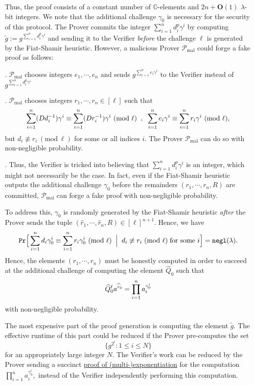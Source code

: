 \documentclass[11pt, lettersize, notitlepage, leqno, footskip=0.6cm]{article}
\newcommand{\pl}{\prod\limits}
\newcommand{\slim}{\sum\limits}
\newcommand{\ttt}{\texttt}
\newcommand{\negl}{\ttt{{negl}}}
\newcommand{\wti}{\widetilde}
\newcommand{\mc}{\mathcal}
\newcommand{\mb}{\mathbb}
\newcommand{\mbf}{\mathbf}
\newcommand{\mr}{\mathrm}
\newcommand{\lam}{\lambda}
\newcommand{\what}{\widehat}
\newcommand{\Prob}{\ttt{Pr}}
\newcommand{\bO}{\mbf{O}}
\newcommand{\mP}{\mc{P}}
\newcommand{\vs}{\vspace{-0.15cm}}
\newcommand{\noin}{\noindent}
\newcommand{\Mod}[1]{\ (\mathrm{mod}\ #1)}
\numberwithin{equation}{section}
\begin{document}
\vspace{0.2cm}

Thus, the proof consists of a constant number of $\mb{G}$-elements and $2n+\bO(1)$ $\lam$-bit integers. We note that the additional challenge $\gamma_{0}$ is necessary for the security of this protocol. The Prover commits the integer $\slim_{i=1}^n d_i^{p}\gamma^i$ by computing $\wti{g} := g^{\slim_{i=1}^n d_i^{p}\gamma^i}$ and sending it to the Verifier \textit{before} the challenge $\ell$ is generated by the Fiat-Shamir heuristic. However, a malicious Prover $\mP_{\mr{mal}}$ could forge a fake proof as follows:

\noin 1. $\mP_{\mr{mal}}$ chooses integers $e_1,\cdots,e_n$ and sends $g^{\slim_{i=1}^n e_i\gamma^i}$ to the Verifier instead of $g^{\slim_{i=1}^n d_i^{p}\gamma^i}$

\noin 2. $\mP_{\mr{mal}}$ chooses integers $r_1,\cdots,r_n\in [\ell]$ such that \vs $$\slim_{i=1}^n (Dd_i^{-1})\gamma^i \equiv \slim_{i=1}^n (Dr_i^{-1})\gamma^i \Mod{\ell}\;\;,\;\; \slim_{i=1}^n e_i\gamma^i\equiv \slim_{i=1}^n r_i\gamma^i \Mod{\ell},\vs $$ but $d_i\not\equiv r_i\Mod{\ell}$ for some or all indices $i$. The Prover $\mP_{\mr{mal}}$ can do so  with non-negligible probability.

\noin 3. Thus, the Verifier is tricked into believing that $\slim_{i=1}^n d_i^{p}\gamma^i$ is an integer, which  might not necessarily be the case. In fact, even if the Fiat-Shamir heuristic outputs the additional challenge $\gamma_{0}$ before the remainders $(r_1,\cdots,r_n, R)$ are committed, $\mP_{\mr{mal}}$ can forge a fake proof with non-negligible probability. 

To address this, $\gamma_{0}$ is randomly generated by the Fiat-Shamir heuristic \textit{after} the Prover sends the tuple $(\what{r}_1,\cdots,\what{r}_n, R)\in[\ell]^{n+1}$. Hence, we have \vs $$\Prob\Big[\slim_{i=1}^n d_i\gamma_{0}^i \equiv \slim_{i=1}^n r_i\gamma_{0}^i \Mod{\ell}\;\;\Big|\;\; d_i\not\equiv r_i\Mod{\ell}\;\text{for some } i\Big] = \negl(\lam).\vs $$ Hence, the elements $(r_1,\cdots,r_n)$ must be honestly computed in order to succeed at the additional challenge of computing the element $\what{Q}_0$ such that \vs $$\what{Q}_0^{\ell}a^{\what{r}_0}= \pl_{i=1}^{n} a_i^{\gamma_{0}^i} \vs $$ with non-negligible probability.

The most expensive part of the proof generation is computing the element $\wti{g}$. The effective runtime of this part could be reduced if the Prover pre-computes the set \vs $$\{g^{2^i}: 1\leq i\leq N \} $$ for an appropriately large integer $N$. The Verifier's work can be reduced by the Prover sending a succinct \hyperlink{PoME}{proof of (multi-)exponentiation} for the computation $\prod_{i=1}^n a_i^{\gamma_{0}^i},$ instead of the Verifier independently performing this computation.
\end{document}
